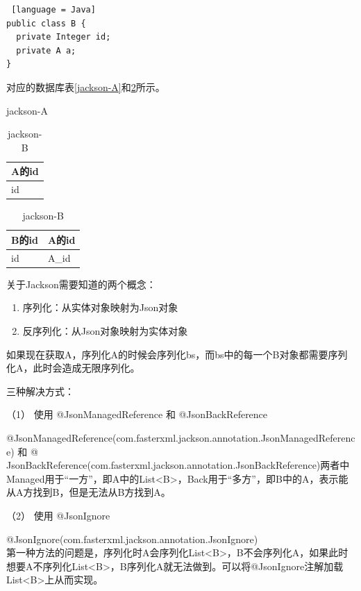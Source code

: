 \begin{lstlisting} [language = Java]
public class B {
  private Integer id;
  private A a;
}
\end{lstlisting}

对应的数据库表\ref{jackson-A}和\ref{jackson-B}所示。

\begin{table}[htbp]
  \begin{minipage}{0.45\linewidth}
    \centering
    \song\wuhao
    \caption{jackson-A}
    \label{jackson-A}
    \begin{tabular}{l}
      \hline
      A的id \\ \hline
      id    \\ \hline
    \end{tabular}
  \end{minipage}
  \begin{minipage}{0.45\linewidth}
    \centering
    \song\wuhao
    \caption{jackson-B}
    \label{jackson-B}
    \begin{tabular}{ll}
      \hline
      B的id & A的id \\ \hline
      id    & A\_id \\ \hline
    \end{tabular}
  \end{minipage}
\end{table}

关于Jackson需要知道的两个概念：
\begin{enumerate}
  \item 序列化：从实体对象映射为Json对象
  \item 反序列化：从Json对象映射为实体对象
\end{enumerate}

如果现在获取A，序列化A的时候会序列化bs，而bs中的每一个B对象都需要序列化A，此时会造成无限序列化。

三种解决方式：

（1） 使用 @JsonManagedReference 和 @JsonBackReference

@JsonManagedReference(com.fasterxml.jackson.annotation.JsonManagedReference) 和 @\\JsonBackReference(com.fasterxml.jackson.annotation.JsonBackReference)两者中Managed用于“一方”，即A中的List<B>，Back用于“多方”，即B中的A，表示能从A方找到B，但是无法从B方找到A。

（2） 使用 @JsonIgnore

@JsonIgnore(com.fasterxml.jackson.annotation.JsonIgnore)\\
第一种方法的问题是，序列化时A会序列化List<B>，B不会序列化A，如果此时想要A不序列化List<B>，B序列化A就无法做到。可以将@JsonIgnore注解加载List<B>上从而实现。


